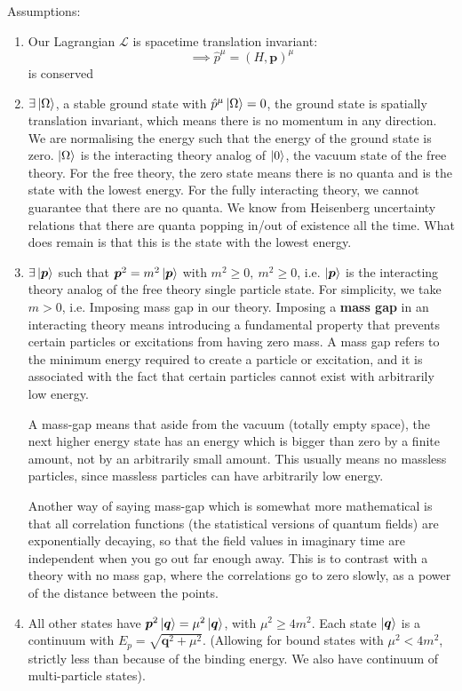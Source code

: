 Assumptions: 
\begin{enumerate}
    \item Our Lagrangian $\mathcal{L}$ is spacetime translation invariant:
    $$\implies \hat{p}^\mu = (H, \bm{p})^\mu$$ is conserved 
    \item $\exists \ket{\Omega}$, a stable ground state with $\hat{p}^\mu\ket{\Omega} = 0$, the ground state is spatially translation invariant, which means there is no momentum in any direction. We are normalising the energy such that the energy of the ground state is zero. $\ket{\Omega}$ is the interacting theory analog of $\ket{0}$, the vacuum state of the free theory. For the free theory, the zero state means there is no quanta and is the state with the lowest energy. For the fully interacting theory, we cannot guarantee that there are no quanta. We know from Heisenberg uncertainty relations that there are quanta popping in/out of existence all the time. What does remain is that this is the state with the lowest energy. 
    \item $\exists \ket{\bm{p}}$ such that $\bm{p}^2 = m^2 \ket{\bm{p}}$ with $m^2 \geq 0, \:  m^2 \geq 0$, i.e. $\ket{\bm{p}}$ is the interacting theory analog of the free theory single particle state. For simplicity, we take $m>0$, i.e. Imposing mass gap in our theory. Imposing a \textbf{mass gap} in an interacting theory means introducing a fundamental property that prevents certain particles or excitations from having zero mass. A mass gap refers to the minimum energy required to create a particle or excitation, and it is associated with the fact that certain particles cannot exist with arbitrarily low energy.
\begin{definition}A mass-gap means that aside from the vacuum (totally empty space), the next higher energy state has an energy which is bigger than zero by a finite amount, not by an arbitrarily small amount. This usually means no massless particles, since massless particles can have arbitrarily low energy.
\end{definition}
Another way of saying mass-gap which is somewhat more mathematical is that all correlation functions (the statistical versions of quantum fields) are exponentially decaying, so that the field values in imaginary time are independent when you go out far enough away. This is to contrast with a theory with no mass gap, where the correlations go to zero slowly, as a power of the distance between the points.
    \item  All other states have $\bm{p}^2 \ket{\bm{q}} = \mu^2 \ket{\bm{q}}$, with $\mu^2 \geq 4m^2$. Each state $\ket{\bm{q}}$ is a continuum with $E_p = \sqrt{\bm{q}^2 + \mu^2}$. (Allowing for bound states with $\mu^2 < 4m^2$, strictly less than because of the binding energy. We also have continuum of multi-particle states). 
\end{enumerate}

